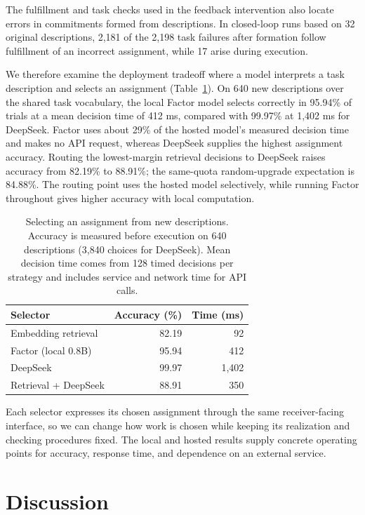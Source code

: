 \documentclass[sigconf,nonacm,balance=false]{aamas}
\newcommand{\tabstyle}{\small\setlength{\tabcolsep}{3pt}\renewcommand{\arraystretch}{1.10}}
\begin{document}
The fulfillment and task checks used in the feedback intervention also locate errors in commitments formed from descriptions. In closed-loop runs based on 32 original descriptions, 2,181 of the 2,198 task failures after formation follow fulfillment of an incorrect assignment, while 17 arise during execution.

We therefore examine the deployment tradeoff where a model interprets a task description and selects an assignment (Table~\ref{tab:selection-main}). On 640 new descriptions over the shared task vocabulary, the local Factor model selects correctly in 95.94\% of trials at a mean decision time of 412 ms, compared with 99.97\% at 1,402 ms for DeepSeek. Factor uses about 29\% of the hosted model's measured decision time and makes no API request, whereas DeepSeek supplies the highest assignment accuracy. Routing the lowest-margin retrieval decisions to DeepSeek raises accuracy from 82.19\% to 88.91\%; the same-quota random-upgrade expectation is 84.88\%. The routing point uses the hosted model selectively, while running Factor throughout gives higher accuracy with local computation.

\begin{table}[t]
\centering\tabstyle
\caption{Selecting an assignment from new descriptions. Accuracy is measured before execution on 640 descriptions (3,840 choices for DeepSeek). Mean decision time comes from 128 timed decisions per strategy and includes service and network time for API calls.}
\label{tab:selection-main}
\begin{tabular}{@{}lrr@{}}\toprule
Selector & Accuracy (\%) & Time (ms)\\\midrule
Embedding retrieval & 82.19 & 92\\
Factor (local 0.8B) & 95.94 & 412\\
DeepSeek & 99.97 & 1,402\\
Retrieval + DeepSeek & 88.91 & 350\\\bottomrule
\end{tabular}
\end{table}

Each selector expresses its chosen assignment through the same receiver-facing interface, so we can change how work is chosen while keeping its realization and checking procedures fixed. The local and hosted results supply concrete operating points for accuracy, response time, and dependence on an external service.

\section{Discussion}
\label{sec:discussion}
\end{document}

